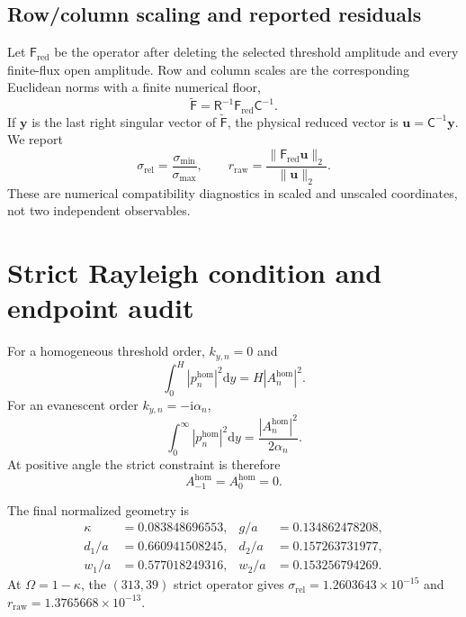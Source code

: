 \documentclass[aps,prl,reprint,superscriptaddress,nofootinbib,floatfix]{revtex4-2}
\newcommand{\ii}{\mathrm{i}}
\providecommand{\hom}{\mathrm{hom}}
\begin{document}
\subsection{Row/column scaling and reported residuals}

Let $\mathsf F_{\mathrm{red}}$ be the operator after deleting the selected
threshold amplitude and every finite-flux open amplitude.  Row and column
scales are the corresponding Euclidean norms with a finite numerical floor,
\begin{equation}
 \widetilde{\mathsf F}=\mathsf R^{-1}
 \mathsf F_{\mathrm{red}}\mathsf C^{-1}.                               \label{eq:s-scale}
\end{equation}
If $\bm y$ is the last right singular vector of
$\widetilde{\mathsf F}$, the physical reduced vector is
$\bm u=\mathsf C^{-1}\bm y$.  We report
\begin{equation}
 \sigma_{\mathrm{rel}}=\frac{\sigma_{\min}}{\sigma_{\max}},\qquad
 r_{\mathrm{raw}}=
 \frac{\|\mathsf F_{\mathrm{red}}\bm u\|_2}{\|\bm u\|_2}.           \label{eq:s-residual}
\end{equation}
These are numerical compatibility diagnostics in scaled and unscaled
coordinates, not two independent observables.

\section{Strict Rayleigh condition and endpoint audit}

For a homogeneous threshold order, $k_{y,n}=0$ and
\begin{equation}
 \int_0^H|p_n^{\hom}|^2\mathrm{d}y=H|A_n^{\hom}|^2.                    \label{eq:s-threshold-norm}
\end{equation}
For an evanescent order $k_{y,n}=-\ii\alpha_n$,
\begin{equation}
 \int_0^\infty|p_n^{\hom}|^2\mathrm{d}y=
 \frac{|A_n^{\hom}|^2}{2\alpha_n}.                                   \label{eq:s-evan-norm}
\end{equation}
At positive angle the strict constraint is therefore
\begin{equation}
 A_{-1}^{\hom}=A_0^{\hom}=0.                                          \label{eq:s-strict}
\end{equation}

The final normalized geometry is
\begin{equation}
 \begin{aligned}
 \kappa&=0.083848696553, & g/a&=0.134862478208,\\
 d_1/a&=0.660941508245, & d_2/a&=0.157263731977,\\
 w_1/a&=0.577018249316, & w_2/a&=0.153256794269.
 \end{aligned}                                                          \label{eq:s-design}
\end{equation}
At $\Omega=1-\kappa$, the $(313,39)$ strict operator gives
$\sigma_{\mathrm{rel}}=1.2603643\times10^{-15}$ and
$r_{\mathrm{raw}}=1.3765668\times10^{-13}$.
\end{document}
